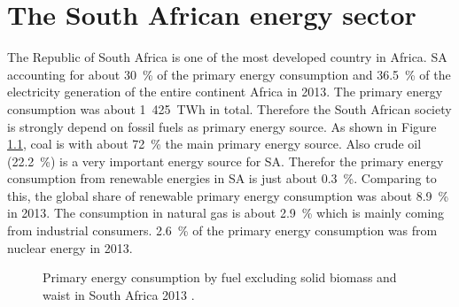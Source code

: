 \chapter{The South African energy sector}
The Republic of South Africa is one of the most developed country in Africa. SA accounting for about 30~\% of the primary energy consumption and 36.5~\% of the electricity generation of the entire continent Africa in 2013. The primary energy consumption was about 1~425~TWh in total. Therefore the South African society is strongly depend on fossil fuels as primary energy source. As shown in Figure \ref{PEKreis}, coal is with about 72~\% the main primary energy source. Also crude oil (22.2~\%) is a very important energy source for SA. Therefor the primary energy consumption from renewable energies in SA is just about 0.3~\%. Comparing to this, the global share of  renewable primary energy consumption was about 8.9~\% in 2013. The consumption in natural gas is about 2.9~\% which is mainly coming from industrial consumers. 2.6~\% of the primary energy consumption was from nuclear energy in 2013. \cite{BP2014b,Agency2015}
%
\begin{figure}[!h] %
\centering
\def\angle{0}
\def\radius{2.5}
\def\cyclelist{{"brown","orange","yellow","black","green"}}
\newcount\cyclecount {}
\newcount\ind {}

\caption[Primary energy consumption by fuel excluding solid biomass and waist in South Africa 2013.]{Primary energy consumption by fuel excluding solid biomass and waist in South Africa 2013 \cite{BP2014b}.}\label{PEKreis}
\end{figure}

